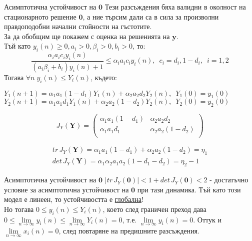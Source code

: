 \begin{frame}[t]{Асимптотична устойчивост на $\mathbf{0}$}
Тези разсъждения бяха валидни в околност на стационарното решение $\mathbf{0}$, а ние търсим дали са в сила за произволни правдоподобни начални стойности на гъстотите. \\
За да обобщим ще покажем с оценка на решенията на $\mathbf{y}$. \\
Тъй като $y_{i}(n) \geq 0, a_{i} > 0, \beta_{i} > 0, b_{i}>0$, то:
\[\frac{\alpha_{i} a_{i} c_{i} y_{i}(n)}{(a_{i} \beta_{i} + b_{i}) y_{i}(n) + 1} \leq
\alpha_{i} a_{i} c_{i} y_{i}(n),\enspace c_{i}=d_{i},1-d_{i}, \enspace i=1,2\]
Тогава $\forall{n} \; y_{i}(n) \leq Y_{i}(n)$, където:

$Y_{1}(n+1)=\alpha_{1} a_{1} (1-d_{1}) Y_{1}(n) + \alpha_{2} a_{2} d_{2} Y_{2}(n), \enspace Y_{1}(0)=y_{1}(0)$ \\
$Y_{2}(n+1)=\alpha_{1} a_{1} d_{1} Y_{1}(n) +
\alpha_{2} a_{2} (1-d_{2}) Y_{2}(n), \enspace Y_{2}(0)=y_{2}(0)$

\[J_{Y}(\mathbf{Y})=\left(
\begin{array}{cc}
 \alpha_{1} a_{1} (1-d_{1}) & \alpha_{2} a_{2} d_{2}
 \\
 \alpha_{1} a_{1} d_{1} & \alpha_{2} a_{2} (1-d_{2})
 \\
\end{array}
\right)\]


\[\begin{array}{c}
tr \, J_{Y}(\mathbf{Y}) = \alpha_{1} a_{1} (1-d_{1}) + \alpha_{2} a_{2} (1-d_{2}) = \eta_{1}  \\
det \, J_{Y}(\mathbf{Y}) = \alpha_{1} \alpha_{2} a_{1} a_{2} (1 - d_{1} - d_{2}) = \eta_{2} - 1
\end{array}\]

\end{frame}

\begin{frame}[t]{Асимптотична устойчивост на $\mathbf{0}$}
$\lvert tr \, J_{Y}(\mathbf{0}) \rvert < 1 + det \, J_{Y}(\mathbf{0}) < 2$ - достатъчно условие за асимптотична устойчивост на $\mathbf{0}$ при тази динамика. Тъй като този модел е линеен, то устойчивостта е \underline{глобална}! \\
Но тогава $0 \leq y_{i}(n) \leq Y_{i}(n)$, което след граничен преход дава $0 \leq \lim\limits_{n \to \infty}y_{i}(n) \leq \lim\limits_{n \to \infty}Y_{i}(n)=0$, т.е. $\lim\limits_{n \to \infty}y_{i}(n)=0$. Оттук и $\lim\limits_{n \to \infty}x_{i}(n)=0$, след повтаряне на предишните разсъждения.

\end{frame}
